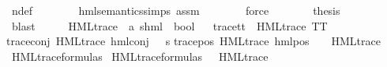 \begin{isabellebody}
\ n{\isasymphi}{\isacharunderscore}{\kern0pt}def\isanewline
\ \ \ \ \ \ \isamarkupfalse%
\ hml{\isacharunderscore}{\kern0pt}semantics{\isachardot}{\kern0pt}simps\ assm\isanewline
\ \ \ \ \ \ \isamarkupfalse%
\ force\isanewline
\ \ \ \ \isamarkupfalse%
\ \isamarkupfalse%
\ {\isacharquery}{\kern0pt}thesis\isanewline
\ \ \ \ \ \ \isamarkupfalse%
\ blast\isanewline
\ \ \isamarkupfalse%
\isanewline
{}\isamarkupfalse%
%
\endisatagproof
{\isafoldproof}%
%
\isadelimproof
\isanewline
%
\endisadelimproof
\isanewline
{}\isamarkupfalse%
\ \isanewline
\isanewline
\isanewline
\isanewline
{}\isamarkupfalse%
\ HML{\isacharunderscore}{\kern0pt}trace\ {\isacharcolon}{\kern0pt}{\isacharcolon}{\kern0pt}\ {\isachardoublequoteopen}{\isacharparenleft}{\kern0pt}{\isacharprime}{\kern0pt}a{\isacharcomma}{\kern0pt}\ {\isacharprime}{\kern0pt}s{\isacharparenright}{\kern0pt}hml\ {\isasymRightarrow}\ bool{\isachardoublequoteclose}\isanewline
\ \ \isanewline
trace{\isacharunderscore}{\kern0pt}tt\ {\isacharcolon}{\kern0pt}\ {\isachardoublequoteopen}HML{\isacharunderscore}{\kern0pt}trace\ TT{\isachardoublequoteclose}\ {\isacharbar}{\kern0pt}\isanewline
trace{\isacharunderscore}{\kern0pt}conj{\isacharcolon}{\kern0pt}\ {\isachardoublequoteopen}HML{\isacharunderscore}{\kern0pt}trace\ {\isacharparenleft}{\kern0pt}hml{\isacharunderscore}{\kern0pt}conj\ {\isacharbraceleft}{\kern0pt}{\isacharbraceright}{\kern0pt}\ {\isacharbraceleft}{\kern0pt}{\isacharbraceright}{\kern0pt}\ {\isasympsi}s{\isacharparenright}{\kern0pt}{\isachardoublequoteclose}{\isacharbar}{\kern0pt}\isanewline
trace{\isacharunderscore}{\kern0pt}pos{\isacharcolon}{\kern0pt}\ {\isachardoublequoteopen}HML{\isacharunderscore}{\kern0pt}trace\ {\isacharparenleft}{\kern0pt}hml{\isacharunderscore}{\kern0pt}pos\ {\isasymalpha}\ {\isasymphi}{\isacharparenright}{\kern0pt}{\isachardoublequoteclose}\ \ {\isachardoublequoteopen}HML{\isacharunderscore}{\kern0pt}trace\ {\isasymphi}{\isachardoublequoteclose}\isanewline
\isanewline
{}\isamarkupfalse%
\ HML{\isacharunderscore}{\kern0pt}trace{\isacharunderscore}{\kern0pt}formulas\ \isanewline
{\isachardoublequoteopen}HML{\isacharunderscore}{\kern0pt}trace{\isacharunderscore}{\kern0pt}formulas\ {\isasymequiv}\ {\isacharbraceleft}{\kern0pt}{\isasymphi}{\isachardot}{\kern0pt}\ HML{\isacharunderscore}{\kern0pt}trace\ {\isasymphi}{\isacharbraceright}{\kern0pt}{\isachardoublequoteclose}%
\begin{isamarkuptext}%

\end{isamarkuptext}
\end{isabellebody}
